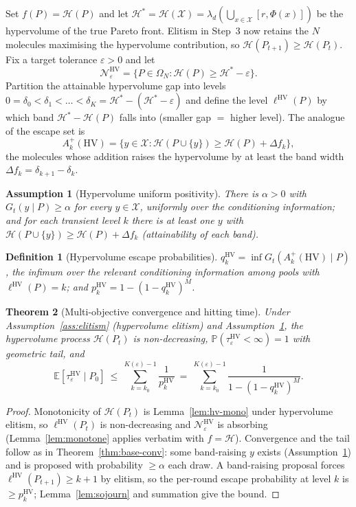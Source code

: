 \documentclass[11pt,a4paper]{article}
\newtheorem{theorem}{Theorem}[section]
\newtheorem{definition}[theorem]{Definition}
\newtheorem{assumption}{Assumption}   %
\newcommand{\X}{\mathcal{X}}
\newcommand{\Omn}{\Omega_N}
\newcommand{\E}{\mathbb{E}}
\newcommand{\Prob}{\mathbb{P}}
\newcommand{\Akp}{A_k^{+}}
\begin{document}
Set $f(P)=\mathcal H(P)$ and let $\mathcal H^*=\mathcal
H(\X)=\lambda_d(\bigcup_{x\in\X}[r,\Phi(x)])$ be the hypervolume of the
true Pareto front.  Elitism in Step~3 now retains the $N$ molecules
maximising the hypervolume contribution, so $\mathcal H(P_{t+1})\ge
\mathcal H(P_t)$.  Fix a target tolerance $\varepsilon>0$ and let
\[
  \mathcal N_\varepsilon^{\mathrm{HV}}
  =\{P\in\Omn:\mathcal H(P)\ge\mathcal H^*-\varepsilon\}.
\]
Partition the attainable hypervolume gap into levels
$0=\delta_0<\delta_1<\dots<\delta_K=\mathcal H^*-(\mathcal
H^*-\varepsilon)$ and define the level $\ell^{\mathrm{HV}}(P)$ by which
band $\mathcal H^*-\mathcal H(P)$ falls into (smaller gap $=$ higher
level).  The analogue of the escape set is
\[
  \Akp(\mathrm{HV})
  =\bigl\{y\in\X : \mathcal H(P\cup\{y\})\ge\mathcal H(P)+\Delta f_k\bigr\},
\]
the molecules whose addition raises the hypervolume by at least the
band width $\Delta f_k=\delta_{k+1}-\delta_k$.

\begin{assumption}[Hypervolume uniform positivity]\label{ass:hv-pos}
  There is $\alpha>0$ with $G_t(y\mid P)\ge\alpha$ for every $y\in\X$,
  uniformly over the conditioning information; and for each transient
  level $k$ there is at least one $y$ with $\mathcal
  H(P\cup\{y\})\ge\mathcal H(P)+\Delta f_k$ (attainability of each band).
\end{assumption}

\begin{definition}[Hypervolume escape probabilities]\label{def:hv-qk}
  $q_k^{\mathrm{HV}}=\inf G_t(\Akp(\mathrm{HV})\mid P)$, the infimum over
  the relevant conditioning information among pools with
  $\ell^{\mathrm{HV}}(P)=k$; and $p_k^{\mathrm{HV}}=1-(1-q_k^{\mathrm{HV}})^M$.
\end{definition}

\begin{theorem}[Multi-objective convergence and hitting time]
\label{thm:hv-htb}
  Under Assumption~\ref{ass:elitism} (hypervolume elitism) and
  Assumption~\ref{ass:hv-pos}, the hypervolume process $\mathcal H(P_t)$
  is non-decreasing, $\Prob(\tau_\varepsilon^{\mathrm{HV}}<\infty)=1$
  with geometric tail, and
  \[
    \E[\tau_\varepsilon^{\mathrm{HV}}\mid P_0]
    \ \le\ \sum_{k=k_0}^{K(\varepsilon)-1}\frac1{p_k^{\mathrm{HV}}}
    \ =\ \sum_{k=k_0}^{K(\varepsilon)-1}\frac1{1-(1-q_k^{\mathrm{HV}})^M}.
  \]
\end{theorem}

\begin{proof}
  Monotonicity of $\mathcal H(P_t)$ is Lemma~\ref{lem:hv-mono} under
  hypervolume elitism, so $\ell^{\mathrm{HV}}(P_t)$ is non-decreasing and
  $\mathcal N_\varepsilon^{\mathrm{HV}}$ is absorbing
  (Lemma~\ref{lem:monotone} applies verbatim with $f=\mathcal H$).
  Convergence and the tail follow as in Theorem~\ref{thm:base-conv}:
  some band-raising $y$ exists (Assumption~\ref{ass:hv-pos}) and is
  proposed with probability $\ge\alpha$ each draw.  A band-raising
  proposal forces $\ell^{\mathrm{HV}}(P_{t+1})\ge k+1$ by elitism, so the
  per-round escape probability at level $k$ is $\ge p_k^{\mathrm{HV}}$;
  Lemma~\ref{lem:sojourn} and summation give the bound.
\end{proof}
\end{document}
